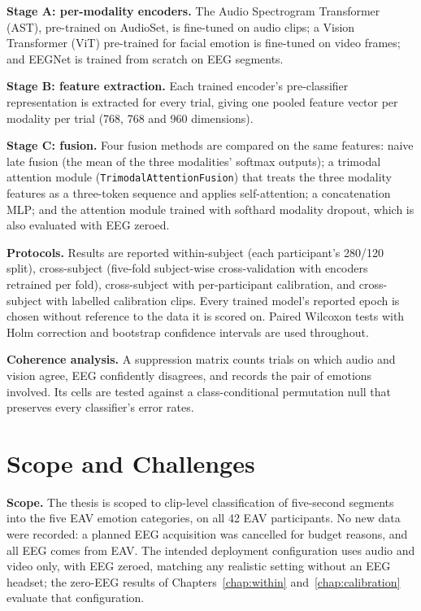 \textbf{Stage A: per-modality encoders.} The Audio Spectrogram Transformer (AST), pre-trained on AudioSet, is fine-tuned on audio clips; a Vision Transformer (ViT) pre-trained for facial emotion is fine-tuned on video frames; and EEGNet is trained from scratch on EEG segments.

\textbf{Stage B: feature extraction.} Each trained encoder's pre-classifier representation is extracted for every trial, giving one pooled feature vector per modality per trial (768, 768 and 960 dimensions).

\textbf{Stage C: fusion.} Four fusion methods are compared on the same features: naive late fusion (the mean of the three modalities' softmax outputs); a trimodal attention module (\texttt{TrimodalAttentionFusion}) that treats the three modality features as a three-token sequence and applies self-attention; a concatenation MLP; and the attention module trained with softhard modality dropout, which is also evaluated with EEG zeroed.

\textbf{Protocols.} Results are reported within-subject (each participant's 280/120 split), cross-subject (five-fold subject-wise cross-validation with encoders retrained per fold), cross-subject with per-participant calibration, and cross-subject with labelled calibration clips. Every trained model's reported epoch is chosen without reference to the data it is scored on. Paired Wilcoxon tests with Holm correction and bootstrap confidence intervals are used throughout.

\textbf{Coherence analysis.} A suppression matrix counts trials on which audio and vision agree, EEG confidently disagrees, and records the pair of emotions involved. Its cells are tested against a class-conditional permutation null that preserves every classifier's error rates.

\section{Scope and Challenges}
\textbf{Scope.} The thesis is scoped to clip-level classification of five-second segments into the five EAV emotion categories, on all 42 EAV participants. No new data were recorded: a planned EEG acquisition was cancelled for budget reasons, and all EEG comes from EAV. The intended deployment configuration uses audio and video only, with EEG zeroed, matching any realistic setting without an EEG headset; the zero-EEG results of Chapters~\ref{chap:within} and~\ref{chap:calibration} evaluate that configuration.

